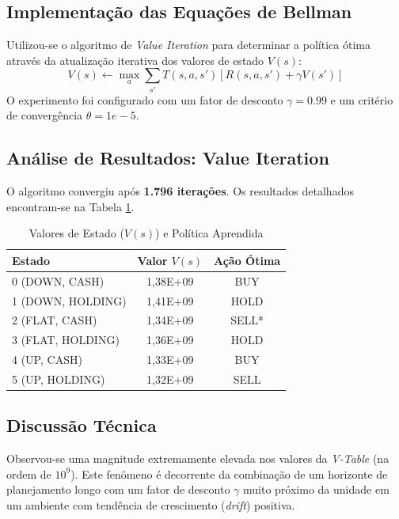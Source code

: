 \documentclass[12pt,a4paper]{article}
\begin{document}
\subsection{Implementação das Equações de Bellman}
Utilizou-se o algoritmo de \textit{Value Iteration} para determinar a política ótima através da
atualização iterativa dos valores de estado $V(s)$:
\[ V(s) \leftarrow \max_{a} \sum_{s'} T(s,a,s') [R(s,a,s') + \gamma V(s')] \]
O experimento foi configurado com um fator de desconto $\gamma = 0.99$ e um critério de convergência $\theta = 1e-5$.
\subsection{Análise de Resultados: Value Iteration}
O algoritmo convergiu após \textbf{1.796 iterações}. Os resultados detalhados encontram-se na Tabela \ref{tab:v_table}.

\begin{table}[h]
	\centering
	\caption{Valores de Estado ($V(s)$) e Política Aprendida}
	\label{tab:v_table}
	\begin{tabular}{l|c|c}
		\hline
		\textbf{Estado}   & \textbf{Valor $V(s)$} & \textbf{Ação Ótima} \\ \hline
		0 (DOWN, CASH)    & 1,38E+09              & BUY                 \\
		1 (DOWN, HOLDING) & 1,41E+09              & HOLD                \\
		2 (FLAT, CASH)    & 1,34E+09              & SELL*               \\
		3 (FLAT, HOLDING) & 1,36E+09              & HOLD                \\
		4 (UP, CASH)      & 1,33E+09              & BUY                 \\
		5 (UP, HOLDING)   & 1,32E+09              & SELL                \\ \hline
	\end{tabular}
\end{table}

\subsection{Discussão Técnica}
Observou-se uma magnitude extremamente elevada nos valores da \textit{V-Table} (na ordem de $10^9$). Este fenômeno é
decorrente da combinação de um horizonte de planejamento longo com um fator de desconto $\gamma$ muito próximo
da unidade em um ambiente com tendência de crescimento (\textit{drift}) positiva.
\end{document}
